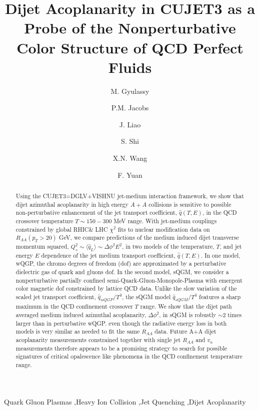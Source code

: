 \begin{frontmatter}
\title{Dijet Acoplanarity in CUJET3 as a Probe of the Nonperturbative Color Structure of QCD Perfect Fluids}
\author[label1,label2]{M. Gyulassy}
\author[label1]{P.M. Jacobs}
\author[label3]{J. Liao}
\author[label1,label2]{S. Shi}
\author[label1,label2]{X.N. Wang}
\author[label1]{F. Yuan}
\address[label1]{Nuclear Science Division, Lawrence Berkeley National Laboratory, Berkeley, CA 94720, USA}
\address[label2]{Institute of Particle Physics, Central China Normal University, Wuhan, China}
\address[label3]{Physics Department and Center for Exploration of Energy and Matter, Indiana University, 2401 N Milo B. Sampson Lane, Bloomington, IN 47408, USA}
\address[label4]{Dept. of Physics, McGill University, 3600 rue University, Montreal, QC H3A 2T8, Canada}
\begin{abstract}
Using the CUJET3=DGLV+VISHNU jet-medium interaction framework, we show that dijet azimuthal acoplanarity in high energy $A+A$ collisions is sensitive to possible non-perturbative enhancement of the jet transport coefficient, $\hat{q}(T,E)$, in the QCD crossover temperature $T\sim 150-300$ MeV range. With jet-medium couplings constrained by global RHIC\& LHC $\chi^2$ fits to nuclear modification data on $R_{AA}(p_T>20)$ GeV, we compare predictions of the medium induced dijet transverse momentum squared, $Q_s^2\sim \langle \hat{q}_L \rangle \sim \Delta\phi^2 E^2$, in two models of the temperature, $T$, and jet energy $E$ dependence of the jet medium transport coefficient, $\hat{q}(T,E)$. In one model, wQGP, the chromo degrees of freedom (dof) are approximated by a perturbative dielectric gas of quark and gluons dof. In the second model, sQGM, we consider a nonperturbative partially confined semi-Quark-Gluon-Monopole-Plasma with emergent color magnetic dof constrained by lattice QCD data. Unlike the slow variation of the scaled jet transport coefficient, $\hat{q}_{wQGP}/T^3$, the sQGM model $\hat{q}_{sQGM}/T^3$ features a sharp maximum in the QCD confinement crossover $T$ range. We show that the dijet path averaged medium induced azimuthal acoplanarity, $\Delta\phi^2$, in sQGM is robustly $\sim 2$ times larger than in perturbative wQGP. even though the radiative energy loss in both models is very similar as needed to fit the same $R_{AA}$ data. Future A+A dijet acoplanarity measurements constrained together with single jet $R_{AA}$ and $v_n$ measurements therefore appears to be a promising strategy to search for possible signatures of critical opalescence like phenomena in the QCD confinement temperature range.
\end{abstract}
\begin{keyword}
Quark Gluon Plasmas \sep Heavy Ion Collision \sep Jet Quenching \sep Dijet Acoplanarity
\end{keyword}
\end{frontmatter}
